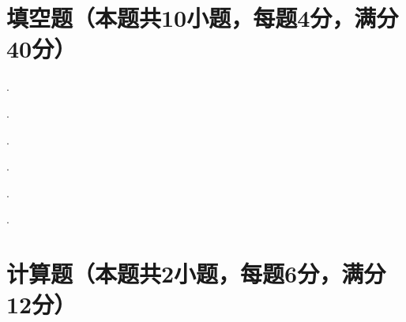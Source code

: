 \documentclass{USTBExam}
\begin{document}
\begin{problem}

\paren[]
\begin{choices}
	\item
	\item
	\item
	\item
\end{choices}
\end{problem}

\section{填空题（本题共10小题，每题4分，满分40分）}

\begin{problem}

\fillin{}.
\end{problem}

\begin{problem}

\fillin{}.
\end{problem}

\begin{problem}

\fillin{}.
\end{problem}

\begin{problem}

\fillin{}.
\end{problem}

\begin{problem}

\fillin{}.
\end{problem}

\begin{problem}

\fillin{}.
\end{problem}

\section{计算题（本题共2小题，每题6分，满分12分）}

\begin{problem}

\end{problem}

\begin{solution}

\end{solution}
\end{document}
